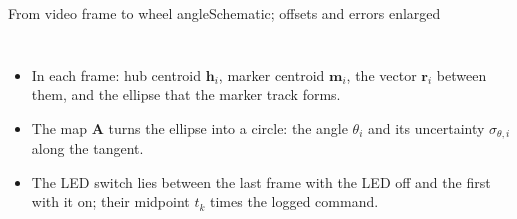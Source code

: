 %
\begin{frame}{From video frame to wheel angle}{Schematic; offsets and errors enlarged}
  \scriptsize
  \begin{columns}[T]
  \centering
  \resizebox{\linewidth}{!}{}
  \begin{itemize}\setlength{\itemsep}{1pt}
    \item[(a)] In each frame: hub centroid $\mathbf h_i$, marker centroid $\mathbf m_i$, the vector $\mathbf r_i$ between them, and the ellipse that the marker track forms.
    \item[(b)] The map $\mathbf A$ turns the ellipse into a circle: the angle $\theta_i$ and its uncertainty $\sigma_{\theta,i}$ along the tangent.
    \item[(c)] The LED switch lies between the last frame with the LED off and the first with it on; their midpoint $t_k$ times the logged command.
  \end{itemize}
  \end{columns}
\end{frame}
